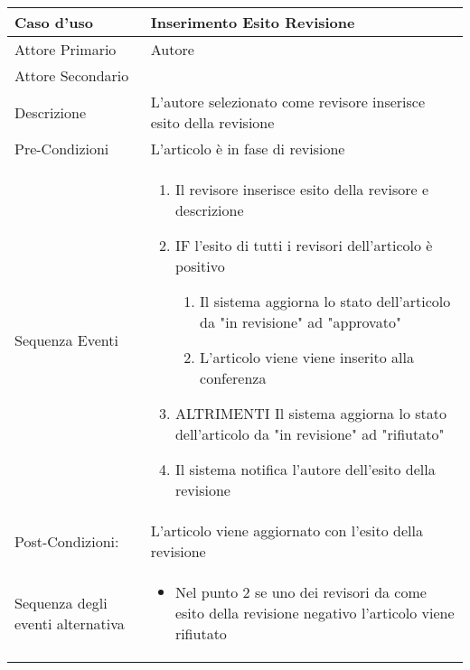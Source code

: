 \begin{tabular}{|p{3cm}|p{7cm}|}
\hline 
\rowcolor{Orchid}
Caso d'uso & Inserimento Esito Revisione\\
\hline
Attore Primario & Autore \\
\hline
Attore Secondario & \\
\hline
Descrizione & L'autore selezionato come revisore inserisce esito della revisione\\
\hline
Pre-Condizioni& L'articolo è in fase di revisione\\
\hline
  Sequenza Eventi&
                   \begin{enumerate}
                   \item Il revisore inserisce esito della revisore e descrizione
                   \item IF l'esito di tutti i revisori dell'articolo è positivo
                   \begin{enumerate}
                    \item Il sistema aggiorna lo stato dell'articolo da "in revisione" ad "approvato" 
                    \item L'articolo viene viene inserito alla conferenza
                   \end{enumerate}
                   \item ALTRIMENTI Il sistema aggiorna lo stato dell'articolo da "in revisione" ad "rifiutato"
                   \item Il sistema notifica l'autore dell'esito della revisione
                   \end{enumerate}\\
\hline
Post-Condizioni: & L'articolo viene aggiornato con l'esito della revisione\\
\hline
Sequenza degli eventi alternativa & \begin{itemize}
  \item Nel punto 2 se uno dei revisori da come esito della revisione negativo l'articolo viene rifiutato
\end{itemize} \\
\hline
\end{tabular}


